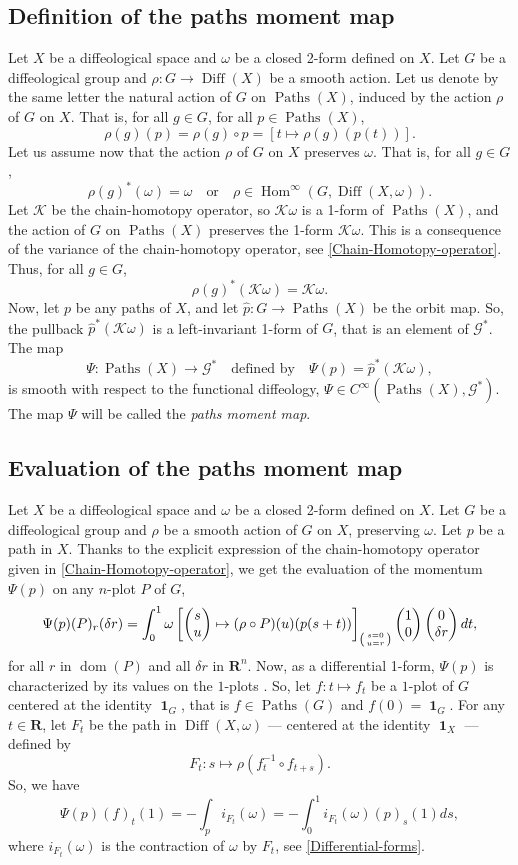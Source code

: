 \documentclass[10pt,reqno,twoside]{amsart}
\newcommand{\qmbox}[1]{\quad\mbox{#1}\quad}
\newcommand{\mymatrix}[1]{\begin{pmatrix} #1 \end{pmatrix}}
\newcommand{\RR}{\mathbf{R}}
\newcommand{\cG}{\mathcal{G}}
\newcommand{\cK}{\mathcal{K}}
\DeclareMathOperator{\dom}{dom}
\DeclareMathOperator{\id}{\mathbf{1}}
\DeclareMathOperator{\Diff}{Diff}
\DeclareMathOperator{\Hom}{Hom}
\DeclareMathOperator{\Paths}{Paths}
\newcommand{\Cinfty}{C^\infty}
\theoremstyle{plain}
\theoremstyle{definition}
\newcommand{\article}[1]{\subsection{#1}}
\begin{document}
  \article{Definition of the paths moment map}
  \label{Definition-of-the-paths-moment-map}
  Let $X$ be a diffeological space and $\omega$ be a closed 2-form defined on $X$.
  Let $G$ be a diffeological group and $\rho : G \to \Diff(X)$ be a smooth action.
  Let us denote by the same letter the natural action of $G$ on $\Paths(X)$,
  induced by the action $\rho$ of $G$ on $X$.
  That is,
  for all $g \in G$,
  for all $p \in \Paths(X)$,
  $$
    \rho(g)(p) = \rho(g) \circ p = [t \mapsto \rho(g)(p(t))].
    $$
  Let us assume now that the action $\rho$ of $G$ on $X$ preserves $\omega$.
  That is,
  for all $g \in G$,
  $$
    \rho(g)^*(\omega) = \omega \qmbox{or} \rho \in \Hom^\infty(G, \Diff(X,\omega)).
    $$
  Let $\cK$ be the chain-homotopy operator,
  so $\cK \omega$ is a 1-form of $\Paths(X)$,
  and the action of $G$ on $\Paths(X)$ preserves the 1-form $\cK \omega$.
  This is a consequence of the variance of the chain-homotopy operator,
  see \ref{Chain-Homotopy-operator}.
  Thus,
  for all $g \in G$,
  $$
    \rho(g)^*(\cK \omega) = \cK \omega.
    $$
  Now,
  let $p$ be any paths of $X$,
  and let $\hat p : G \to \Paths(X)$ be the orbit map.
  So,
  the pullback $\hat p^*(\cK \omega)$ is a left-invariant 1-form of $G$,
  that is an element of $\cG^*$.
  The map
  $$
    \Psi : \Paths(X) \to \cG^* \qmbox{defined by} \Psi(p) = \hat p^*(\cK \omega),
    $$
  is smooth with respect to the functional diffeology,
  $\Psi \in \Cinfty(\Paths(X), \cG^*)$.
  The map $\Psi$ will be called the {\em paths moment map}.
  
  \article{Evaluation of the paths moment map}
  \label{Evaluation-of-the-paths-moment-map}
  Let $X$ be a diffeological space and $\omega$ be a closed 2-form defined on $X$.
  Let $G$ be a diffeological group and $\rho$ be a smooth action of $G$ on $X$,
  preserving $\omega$.
  Let $p$ be a path in $X$.
  Thanks to the explicit expression of the chain-homotopy operator given in \ref{Chain-Homotopy-operator},
  we get the evaluation of the momentum $\Psi(p)$ on any $n$-plot $P$ of $G$,
  \begin{equation}
    \label{eq:heartsuit}
    \Psi(p)(P)_r(\delta r) =
    \int_0^1 \omega \left[ \mymatrix{s \cr u} \mapsto
    (\rho \circ P)(u) (p(s + t)) \right]_{\left({s=0 \atop
    u=r}\right)}\mymatrix{1 \cr 0} \mymatrix{0 \cr \delta r} dt,
  \end{equation}
  for all $r$ in $\dom(P)$ and all $\delta r$ in $\RR^n$.
  Now,
  as a differential 1-form,
  $\Psi(p)$ is characterized by its values on the $1$-plots \cite{Piz05}.
  So,
  let $f : t \mapsto f_t$ be a $1$-plot of $G$ centered at the identity $\id_G$,
  that is $f \in \Paths(G)$ and $f(0) = \id_{G}$.
  For any $t \in \RR$,
  let $F_t$ be the path in $\Diff(X,\omega)$ --- centered at the identity $\id_X$ --- defined by
  $$
    F_t : s \mapsto \rho( f_t^{-1} \circ f_{t+s}).
    $$
  So,
  we have
  \begin{equation}
    \label{eq:clubsuit}
    \Psi(p)(f)_t(1) = - \int_p i_{F_t}(\omega) = - \int_0^1 i_{F_t}(\omega)(p)_s(1) ds,
  \end{equation}
  where $i_{F_t}(\omega) $ is the contraction of $\omega$ by $F_t$,
  see \ref{Differential-forms}.
  
\end{document}
